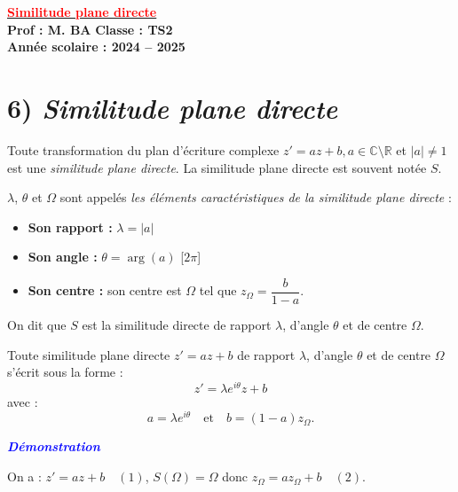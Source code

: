 \documentclass[12pt,a4paper]{article}
\begin{document}
\begin{center}
    \Large\textbf{\underline{\textcolor{red}{Similitude plane directe}}}\\[-0.1cm]
    \normalsize\textbf{Prof : M. BA} \hfill \textbf{Classe : TS2}\\[-0.1cm]
    \textbf{Année scolaire : 2024 -- 2025}
\end{center}

\section*{6) \textit{Similitude plane directe}}

Toute transformation du plan d’écriture complexe \( z' = a z + b,  a \in \mathbb{C} \setminus \mathbb{R} \) et \( |a| \neq 1 \) est une \textit{similitude plane directe}. La similitude plane directe est souvent notée \( S \).

\( \lambda \), \( \theta \) et \( \Omega \) sont appelés \textit{les éléments caractéristiques de la similitude plane directe} :

\begin{itemize}
    \item \textbf{Son rapport :} \( \lambda = |a| \)
    \item \textbf{Son angle :} \( \theta = \arg(a) \) [\(2\pi\)]
    \item \textbf{Son centre :} son centre est \( \Omega \) tel que \( z_{\Omega} = \dfrac{b}{1 - a} \).
\end{itemize}

On dit que \( S \) est la similitude directe de rapport \( \lambda \), d’angle \( \theta \) et de centre \( \Omega \).

\vspace{0.3cm}

Toute similitude plane directe \( z' = a z + b \) de rapport \( \lambda \), d’angle \( \theta \) et de centre \( \Omega \) s'écrit sous la forme :
\[
z' = \lambda e^{i\theta} z + b
\]
avec :
\[
a = \lambda e^{i\theta} \quad \text{et} \quad b = (1 - a) z_{\Omega}.
\]

\textbf{\textcolor{blue}{\textit{Démonstration}}}

\vspace{0.3cm}

On a : \( z' = a z + b \quad (1) \), \quad \( S(\Omega) = \Omega \) \quad donc \( z_{\Omega} = a z_{\Omega} + b \quad (2) \).

\vspace{0.3cm}
\end{document}
